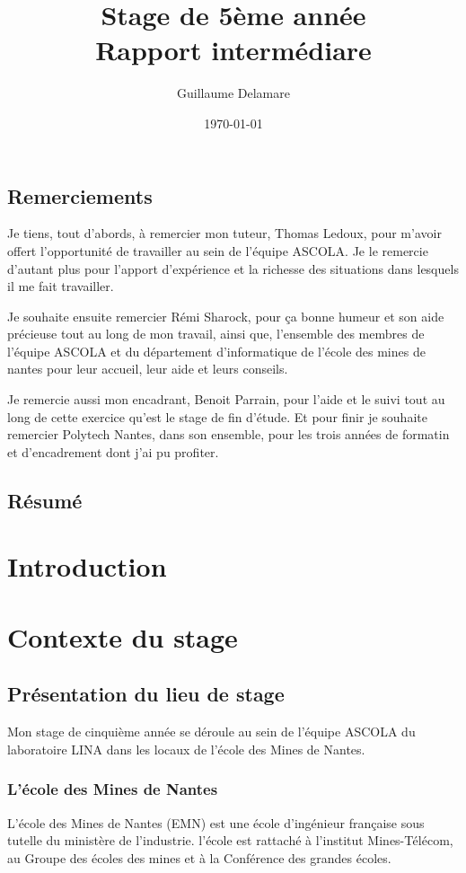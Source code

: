\documentclass[a4paper, 11pt]{report}
\title{Stage de 5ème année\\ \large Rapport intermédiare}
\author{Guillaume Delamare}
\date{\today}
\begin{document}
\maketitle

\section*{Remerciements}
Je tiens, tout d'abords, à remercier mon tuteur, Thomas Ledoux, pour m'avoir offert l'opportunité de travailler au sein de l'équipe ASCOLA. Je le remercie d'autant plus pour l'apport d'expérience et la richesse des situations dans lesquels il me fait travailler.

Je souhaite ensuite remercier Rémi Sharock, pour ça bonne humeur et son aide précieuse tout au long de mon travail, ainsi que, l'ensemble des membres de l'équipe ASCOLA et du département d'informatique de l'école des mines de nantes pour leur accueil, leur aide et leurs conseils.

Je remercie aussi mon encadrant, Benoit Parrain, pour l'aide et le suivi tout au long de cette exercice qu'est le stage de fin d'étude. Et pour finir je souhaite remercier Polytech Nantes, dans son ensemble, pour les trois années de formatin et d'encadrement dont j'ai pu profiter.

\newpage

\section*{Résumé}

\newpage

\tableofcontents



\chapter{Introduction}

\chapter{Contexte du stage}
\section{Présentation du lieu de stage}
Mon stage de cinquième année se déroule au sein de l’équipe ASCOLA du laboratoire LINA dans les locaux de l’école des Mines de Nantes.
\subsection{L'école des Mines de Nantes}
L’école des Mines de Nantes (EMN) est une école d’ingénieur française sous tutelle du ministère de l’industrie. l’école est rattaché à l’institut Mines-Télécom, au Groupe des écoles des mines et à la Conférence des grandes écoles.
\end{document}
